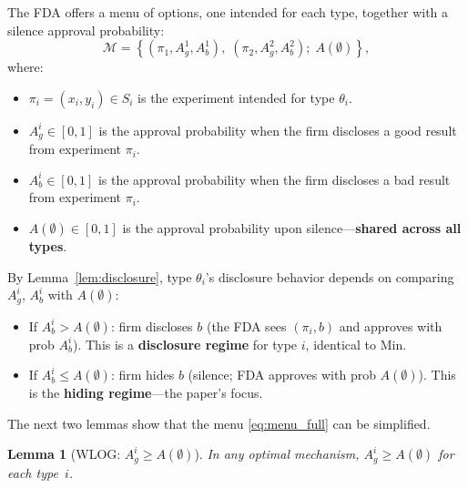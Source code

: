 \documentclass[12pt,a4paper]{article}
\newtheorem{lemma}{Lemma}
\begin{document}
The FDA offers a menu of options, one intended for each type,
together with a silence approval probability:
\begin{equation}\label{eq:menu_full}
  \mathcal{M} = \left\{
    \left(\pi_1, A_g^1, A_b^1\right),\;
    \left(\pi_2, A_g^2, A_b^2\right);\;
    A(\emptyset)
  \right\},
\end{equation}
where:
\begin{itemize}
  \item $\pi_i = (x_i, y_i) \in S_i$ is the experiment
    intended for type $\theta_i$.
  \item $A_g^i \in [0, 1]$ is the approval probability when
    the firm discloses a good result from experiment $\pi_i$.
  \item $A_b^i \in [0, 1]$ is the approval probability when
    the firm discloses a bad result from experiment $\pi_i$.
  \item $A(\emptyset) \in [0, 1]$ is the approval probability
    upon silence---\textbf{shared across all types}.
\end{itemize}

By Lemma~\ref{lem:disclosure}, type $\theta_i$'s disclosure
behavior depends on comparing $A_g^i$, $A_b^i$ with
$A(\emptyset)$:
\begin{itemize}
  \item If $A_b^i > A(\emptyset)$: firm discloses $b$
    (the FDA sees $(\pi_i, b)$ and approves with prob
    $A_b^i$). This is a \textbf{disclosure regime} for type
    $i$, identical to Min.
  \item If $A_b^i \leq A(\emptyset)$: firm hides $b$
    (silence; FDA approves with prob $A(\emptyset)$). This
    is the \textbf{hiding regime}---the paper's focus.
\end{itemize}

The next two lemmas show that the menu
\eqref{eq:menu_full} can be simplified.

\begin{lemma}[WLOG: $A_g^i \geq A(\emptyset)$]
\label{lem:wlog_Ag}
In any optimal mechanism, $A_g^i \geq A(\emptyset)$ for each
type~$i$.
\end{lemma}
\end{document}
